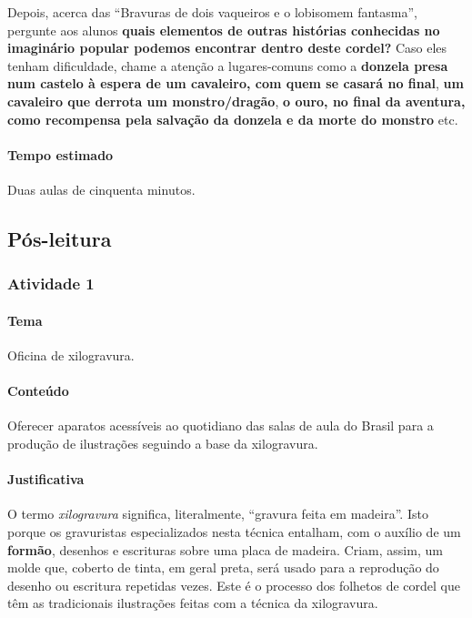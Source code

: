 \documentclass[11pt]{extarticle}
\begin{document}
Depois, acerca das ``Bravuras de dois vaqueiros e o lobisomem fantasma'', 
pergunte aos alunos \textbf{quais elementos de outras histórias conhecidas 
no imaginário popular podemos encontrar dentro deste cordel?} Caso eles 
tenham dificuldade, chame a atenção a lugares-comuns  como a \textbf{donzela presa 
num castelo à espera de um cavaleiro, com quem se casará no final}, \textbf{um cavaleiro 
que derrota um monstro/dragão}, \textbf{o ouro, no final da aventura, como recompensa pela salvação da donzela 
e da morte do monstro} etc.

\paragraph{Tempo estimado} Duas aulas de cinquenta minutos.


\subsection{Pós-leitura}

\subsubsection{Atividade 1} 

\paragraph{Tema} Oficina de xilogravura.

\paragraph{Conteúdo} Oferecer aparatos acessíveis ao quotidiano 
das salas de aula do Brasil para a produção de ilustrações
seguindo a base da xilogravura. 

\paragraph{Justificativa} O termo \textit{xilogravura} significa, literalmente, ``gravura feita em madeira''. 
Isto porque os gravuristas especializados nesta técnica entalham, com o auxílio de 
um \textbf{formão}, desenhos e escrituras sobre uma placa de madeira. 
Criam, assim, um molde que, coberto de tinta, em geral preta, será usado para a reprodução 
do desenho ou escritura repetidas vezes. 
Este é o processo dos folhetos de cordel que têm as tradicionais ilustrações feitas com
a técnica da xilogravura. 
\end{document}
